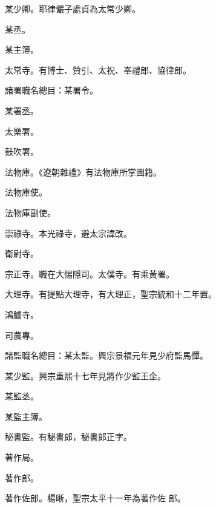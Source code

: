 \begin{pinyinscope}
 某少卿。耶律儼子處貞為太常少卿。



 某丞。



 某主簿。



 太常寺。有博士、贊引、太祝、奉禮郎、協律郎。



 諸署職名總目：某署令。



 某署丞。



 太樂署。



 鼓吹署。



 法物庫。《遼朝雜禮》有法物庫所掌圖籍。



 法物庫使。



 法物庫副使。



 崇祿寺。本光祿寺，避太宗諱改。



 衛尉寺。



 宗正寺。職在大惕隱司。太僕寺。有乘黃署。



 大理寺。有提點大理寺，有大理正，聖宗統和十二年置。



 鴻臚寺。



 司農專。



 諸監職名總目：某太監。興宗景福元年見少府監馬憚。



 某少監。興宗重熙十七年見將作少監王企。



 某監丞。



 某監主簿。



 秘書監。有秘書郎，秘書郎正字。



 著作局。



 著作郎。



 著作佐郎。楊晰，聖宗太平十一年為著作佐
 郎。




\end{pinyinscope}
